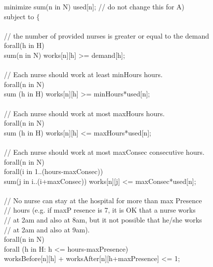 \documentclass[11pt]{article}
\begin{document}
\begin{appendix}
{minimize sum(n in N) used[n]; // do not change this for A)\\
subject to $\{$\\\\
// the number of provided nurses is greater or equal to the demand\\
forall(h in H)\\
sum(n in N) works[n][h] >= demand[h]; \\
\\
// Each nurse should work at least minHours hours.\\
forall(n in N)\\
sum (h in H) works[n][h] >= minHours*used[n];\\
\\
// Each nurse should work at most maxHours hours.\\
forall(n in N)\\
sum (h in H) works[n][h] <= maxHours*used[n];\\
\\
// Each nurse should work at most maxConsec consecutive hours.\\
forall(n in N)\\
forall(i in 1..(hours-maxConsec))\\
sum(j in i..(i+maxConsec)) works[n][j] <= maxConsec*used[n];\\
\\
// No nurse can stay at the hospital for more than max Presence \\
// hours (e.g. if maxP resence is 7, it is OK that a nurse works \\
// at 2am and also at 8am, but it not possible that he/she works \\
// at 2am and also at 9am).\\
forall(n in N)\\
forall (h in H: h <= hours-maxPresence)\\
worksBefore[n][h] + worksAfter[n][h+maxPresence] <= 1;\\

}
\end{appendix}
\end{document}

